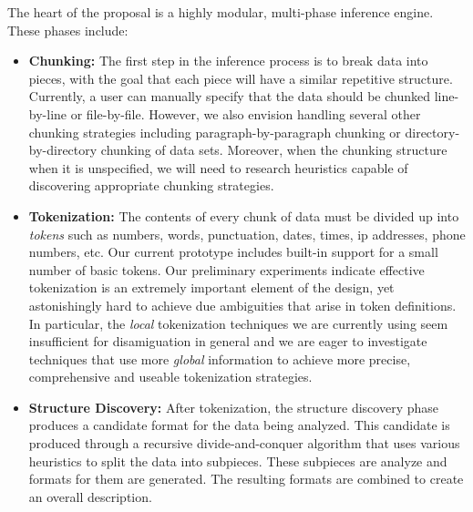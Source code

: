The heart of the proposal is a highly modular, multi-phase inference 
engine.  These phases include:

\begin{itemize}
\item {\bf Chunking:}  The first step in the inference process
is to break data into pieces, with the goal that each piece will have
a similar repetitive structure.  Currently, a user can manually
specify that the data should be chunked line-by-line or file-by-file.
However, we also envision handling several other
chunking strategies including paragraph-by-paragraph chunking or
directory-by-directory chunking of data sets.  Moreover, when the
chunking structure when it is unspecified, we will need to research
heuristics capable of discovering appropriate chunking strategies.

\item {\bf Tokenization:}  
The contents of every chunk of data must be divided up
into {\em tokens} such as numbers, words, punctuation, dates, times, 
ip addresses, phone numbers, etc.  Our current prototype includes built-in
support for a small number of basic tokens.  Our preliminary 
experiments indicate
effective tokenization is an extremely important element of the design, yet
astonishingly hard to achieve due ambiguities that arise in token definitions.
In particular, the {\em local} tokenization techniques we are currently using
seem insufficient for disamiguation in general and we are eager to investigate 
techniques that use more {\em global} information to achieve more precise,
comprehensive and useable tokenization strategies.

\item {\bf Structure Discovery:}
After tokenization, the structure discovery phase produces a
candidate format for the data being analyzed.  This candidate is
produced through a recursive divide-and-conquer algorithm that uses
various heuristics to split the data into subpieces. These
subpieces are analyze and formats for them are generated.
The resulting formats are combined to create an overall description. 
 

\end{itemize}
